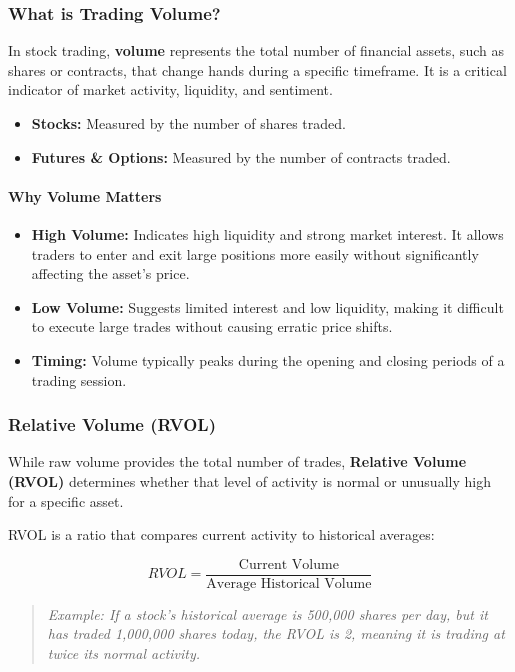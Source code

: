 \documentclass[12pt,openany]{book}
\begin{document}
\subsubsection{What is Trading Volume?}
In stock trading, \textbf{volume} represents the total number of financial assets, such as shares or contracts, that change hands during a specific timeframe. It is a critical indicator of market activity, liquidity, and sentiment.

\begin{itemize}[leftmargin=*]
    \item \textbf{Stocks:} Measured by the number of shares traded.
    \item \textbf{Futures \& Options:} Measured by the number of contracts traded.
\end{itemize}

\paragraph{Why Volume Matters}
\begin{itemize}[leftmargin=*]
    \item \textbf{High Volume:} Indicates high liquidity and strong market interest. It allows traders to enter and exit large positions more easily without significantly affecting the asset's price.
    \item \textbf{Low Volume:} Suggests limited interest and low liquidity, making it difficult to execute large trades without causing erratic price shifts.
    \item \textbf{Timing:} Volume typically peaks during the opening and closing periods of a trading session.
\end{itemize}

\subsubsection{Relative Volume (RVOL)}
While raw volume provides the total number of trades, \textbf{Relative Volume (RVOL)} determines whether that level of activity is normal or unusually high for a specific asset.

RVOL is a ratio that compares current activity to historical averages:

\begin{equation*}
    RVOL = \frac{\text{Current Volume}}{\text{Average Historical Volume}}
\end{equation*}

\begin{quote}
\textit{Example: If a stock's historical average is 500,000 shares per day, but it has traded 1,000,000 shares today, the RVOL is 2, meaning it is trading at twice its normal activity.}
\end{quote}
\end{document}
